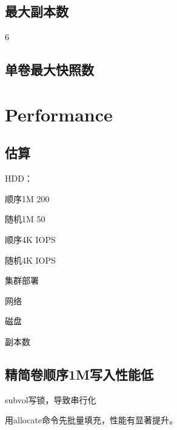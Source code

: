\subsection{最大副本数}

6

\subsection{单卷最大快照数}


\section{Performance}

\subsection{估算}

HDD：
\begin{itembox}
\item 顺序1M 200
\item 随机1M 50
\item 顺序4K IOPS
\item 随机4K IOPS
\end{itembox}

集群部署
\begin{enumbox}
\item 网络
\item 磁盘
\item 副本数
\end{enumbox}

\subsection{精简卷顺序1M写入性能低}

subvol写锁，导致串行化

用allocate命令先批量填充，性能有显著提升。
